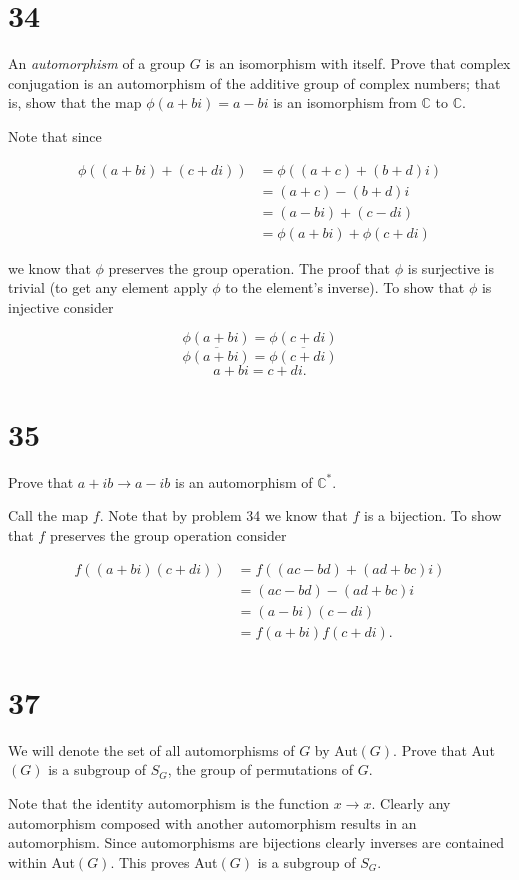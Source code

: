 \documentclass[a4paper]{article}
\begin{document}
\section*{34}

An \textit{automorphism} of a group $G$ is an isomorphism with itself. Prove that complex conjugation is an automorphism of the additive group of complex numbers; that is, show that the map $\phi(a+bi) = a - bi$ is an isomorphism from $\mathbb{C}$ to $\mathbb{C}$.

\vspace{\baselineskip}

Note that since

\begin{align*}
\phi((a+bi) + (c+di)) &= \phi((a+c) + (b+d)i) \\
&= (a+c) - (b+d)i \\
&= (a-bi) + (c-di) \\
&= \phi(a+bi) + \phi(c+di)
\end{align*}

we know that $\phi$ preserves the group operation. The proof that $\phi$ is surjective is trivial (to get any element apply $\phi$ to the element's inverse). To show that $\phi$ is injective consider

$$\phi(a+bi) = \phi(c+di)$$
$$\overline{\phi(a+bi)} = \overline{\phi(c+di)}$$
$$a + bi = c + di.$$


\section*{35}

Prove that $a + ib \rightarrow a- ib$ is an automorphism of $\mathbb{C}^*$.

\vspace{\baselineskip}

Call the map $f$. Note that by problem 34 we know that $f$ is a bijection. To show that $f$ preserves the group operation consider

\begin{align*}
f((a+bi) (c+di)) &= f((ac - bd) + (ad + bc)i) \\
&= (ac - bd) - (ad + bc)i \\
&= (a-bi)(c-di) \\
&= f(a+bi) f(c+di).
\end{align*}


\section*{37}

We will denote the set of all automorphisms of $G$ by Aut$(G)$. Prove that Aut$(G)$ is a subgroup of $S_G$, the group of permutations of $G$.

\vspace{\baselineskip}

Note that the identity automorphism is the function $x \rightarrow x$. Clearly any automorphism composed with another automorphism results in an automorphism. Since automorphisms are bijections clearly inverses are contained within Aut$(G)$. This proves Aut$(G)$ is a subgroup of $S_G$.
\end{document}
